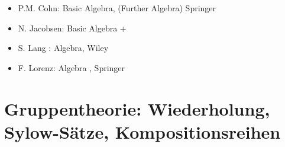 
\newcommand{\fach}{Höhere Algebra \RM{1}}

\newcommand{\prof}{Prof.\,Dr.\,Dr.\,Katrin Tent}



\maketitle
{}

\tableofcontents
\cleardoubleoddemptypage

\setcounter{page}{1}


\begin{itemize}
	\item P.M. Cohn: Basic Algebra, (Further Algebra) Springer
	\item N. Jacobsen: Basic Algebra  + 
	\item S. Lang : Algebra, Wiley
	\item F. Lorenz: Algebra , Springer
\end{itemize}
\newpage

\section{Gruppentheorie: Wiederholung, Sylow-Sätze, Kompositionsreihen} %
\label{sec:1}

